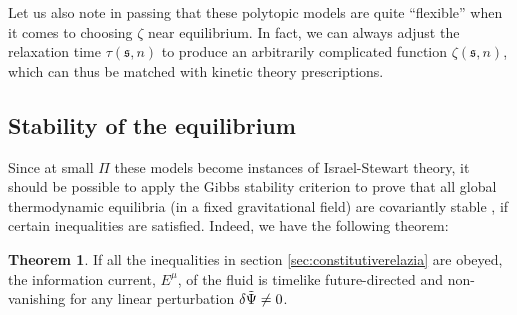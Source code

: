 \documentclass[a4paper, amsfonts, amssymb, amsmath, reprint, showkeys, nofootinbib, twoside,notitlepage,onecolumn]{revtex4-2}
\newcommand{\s}{{\mathfrak{s}}}
\theoremstyle{definition}
\theoremstyle{theorem}
\newtheorem{theorem}{Theorem}
\theoremstyle{corollary}
\begin{document}
Let us also note in passing that these polytopic models are quite ``flexible'' when it comes to choosing $\zeta$ near equilibrium. In fact, we can always adjust the relaxation time $\tau(\s,n)$ to produce an arbitrarily complicated function $\zeta(\s,n)$, which can thus be matched with kinetic theory prescriptions. 


\subsection{Stability of the equilibrium}

Since at small $\Pi$ these models become instances of Israel-Stewart theory, it should be possible to apply the Gibbs stability criterion \cite{GavassinoGibbs2021,GavassinoCausality2021,GavassinoGENERIC2022,GavassinoStabilityCarter2022} to prove that all global thermodynamic equilibria (in a fixed gravitational field) are covariantly stable \cite{GavassinoSuperluminal2021,GavassinoBounds2023}, if certain inequalities are satisfied. Indeed, we have the following theorem:
\begin{theorem}
If all the inequalities in section \ref{sec:constitutiverelazia} are obeyed, the information current, $E^\mu$, of the fluid is timelike future-directed and non-vanishing for any linear perturbation $\delta \Tilde{\Psi}\neq 0$.
\end{theorem}
\end{document}
